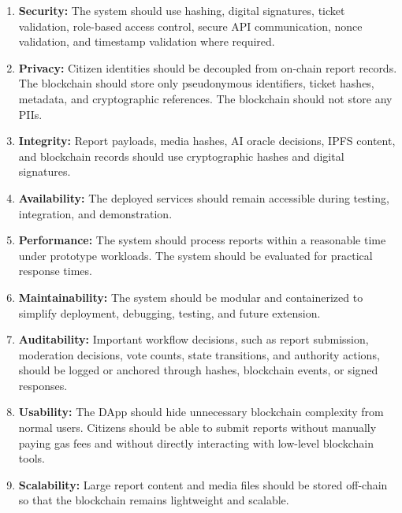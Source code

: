 \begin{enumerate}
    \item \textbf{Security:}
    The system should use hashing, digital signatures, ticket validation, role-based 
    access control, secure API communication, nonce validation, and timestamp 
    validation where required.

    \item \textbf{Privacy:}
    Citizen identities should be decoupled from on-chain report records. The blockchain should store only pseudonymous identifiers, ticket hashes, metadata, and cryptographic references. The blockchain should not store any \ac{PII}s.

    \item \textbf{Integrity:}
    Report payloads, media hashes, AI oracle decisions, IPFS content, and blockchain 
    records should use cryptographic hashes and digital signatures.

    \item \textbf{Availability:}
    The deployed services should remain accessible during testing, integration, and 
    demonstration.

    \item \textbf{Performance:}
    The system should process reports within a reasonable time under prototype 
    workloads. The system should be evaluated for practical response times.

    \item \textbf{Maintainability:}
    The system should be modular and containerized to simplify deployment, debugging, 
    testing, and future extension.

    \item \textbf{Auditability:}
    Important workflow decisions, such as report submission, moderation decisions, 
    vote counts, state transitions, and authority actions, should be logged or anchored through hashes, blockchain events, or signed responses.

    \item \textbf{Usability:}
    The DApp should hide unnecessary blockchain complexity from normal users. 
    Citizens should be able to submit reports without manually paying gas fees and without directly interacting with low-level blockchain tools.

    \item \textbf{Scalability:}
    Large report content and media files should be stored off-chain so that the 
    blockchain remains lightweight and scalable.
\end{enumerate}

